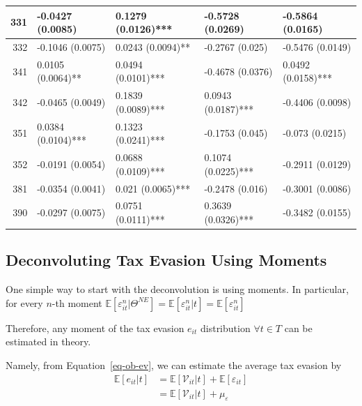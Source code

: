 \documentclass[
  12pt]{article}
\theoremstyle{definition}
\theoremstyle{remark}
\begin{document}
\begin{table}
{\begin{tabular}[t]{r|l|l|l|l}
\hline
\hspace{1em}331 & -0.0427 (0.0085) & 0.1279 (0.0126)*** & -0.5728 (0.0269) & -0.5864 (0.0165)\\
\hline
\hspace{1em}332 & -0.1046 (0.0075) & 0.0243 (0.0094)** & -0.2767 (0.025) & -0.5476 (0.0149)\\
\hline
\hspace{1em}341 & 0.0105 (0.0064)** & 0.0494 (0.0101)*** & -0.4678 (0.0376) & 0.0492 (0.0158)***\\
\hline
\hspace{1em}342 & -0.0465 (0.0049) & 0.1839 (0.0089)*** & 0.0943 (0.0187)*** & -0.4406 (0.0098)\\
\hline
\hspace{1em}351 & 0.0384 (0.0104)*** & 0.1323 (0.0241)*** & -0.1753 (0.045) & -0.073 (0.0215)\\
\hline
\hspace{1em}352 & -0.0191 (0.0054) & 0.0688 (0.0109)*** & 0.1074 (0.0225)*** & -0.2911 (0.0129)\\
\hline
\hspace{1em}381 & -0.0354 (0.0041) & 0.021 (0.0065)*** & -0.2478 (0.016) & -0.3001 (0.0086)\\
\hline
\hspace{1em}390 & -0.0297 (0.0075) & 0.0751 (0.0111)*** & 0.3639 (0.0326)*** & -0.3482 (0.0155)\\
\hline
\end{tabular}

}

\end{table}%

\subsection{Deconvoluting Tax Evasion Using
Moments}\label{deconvoluting-tax-evasion-using-moments}

One simple way to start with the deconvolution is using moments. In
particular, for every \(n\)-th moment
\(\mathbb{E}[\varepsilon_{it}^n|\Theta^{NE}]=\mathbb{E}[\varepsilon_{it}^n|t]=\mathbb{E}[\varepsilon_{it}^n]\)

Therefore, any moment of the tax evasion \(e_{it}\) distribution
\(\forall t\in T\) can be estimated in theory.

Namely, from Equation~\ref{eq-ob-ev}, we can estimate the average tax
evasion by \[
\begin{aligned}
  \mathbb{E}[e_{it}|t]&=\mathbb{E}[\mathcal V_{it}|t]+\mathbb{E}[\varepsilon_{it}]\\
  &=\mathbb{E}[\mathcal V_{it}|t]+\mu_{\varepsilon}
\end{aligned}
\]
\end{document}
